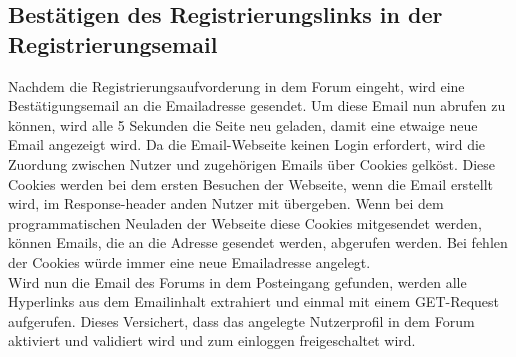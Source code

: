 \subsection{Bestätigen des Registrierungslinks in der Registrierungsemail}
Nachdem die Registrierungsaufvorderung in dem Forum eingeht, wird eine Bestätigungsemail an die Emailadresse gesendet.
Um diese Email nun abrufen zu können, wird alle 5 Sekunden die Seite neu geladen, damit eine etwaige neue Email angezeigt wird. Da die Email-Webseite keinen Login erfordert, wird die Zuordung zwischen Nutzer und zugehörigen Emails über Cookies gelköst. Diese Cookies werden bei dem ersten Besuchen der Webseite, wenn die Email erstellt wird, im Response-header anden Nutzer mit übergeben. Wenn bei dem programmatischen Neuladen der Webseite diese Cookies mitgesendet werden, können Emails, die an die Adresse gesendet werden, abgerufen werden. Bei fehlen der Cookies würde immer eine neue Emailadresse angelegt.\\
Wird nun die Email des Forums in dem Posteingang gefunden, werden alle Hyperlinks aus dem Emailinhalt extrahiert und einmal mit einem GET-Request aufgerufen. Dieses Versichert, dass das angelegte Nutzerprofil in dem Forum aktiviert und validiert wird und zum einloggen freigeschaltet wird.
\newpage